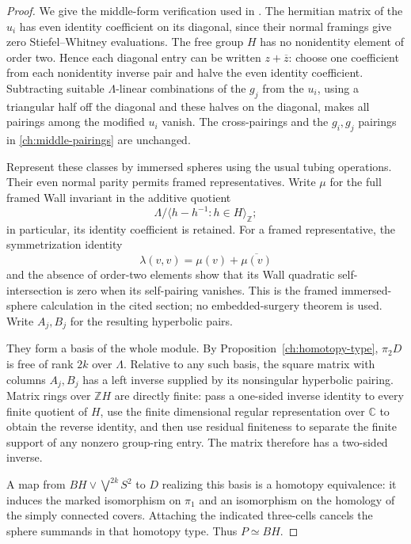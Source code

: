 \begin{proof}
We give the middle-form verification used in
\cite[Section~2.3, ``The middle form and the Poincar\'e pair'']{PD}.
The hermitian matrix of the $u_i$ has even identity coefficient
on its diagonal, since their normal framings give zero
Stiefel--Whitney evaluations.  The free group $H$ has no
nonidentity element of order two.  Hence each diagonal entry
can be written $z+\overline z$: choose one coefficient from
each nonidentity inverse pair and halve the even identity
coefficient.  Subtracting suitable $\Lambda$-linear combinations
of the $g_j$ from the $u_i$, using a triangular half off the
diagonal and these halves on the diagonal, makes all pairings
among the modified $u_i$ vanish.  The cross-pairings and the
$g_i,g_j$ pairings in \eqref{ch:middle-pairings} are unchanged.

Represent these classes by immersed spheres using the usual
tubing operations.  Their even normal parity permits framed
representatives.  Write $\mu$ for the full framed Wall invariant
in the additive quotient
\[
 \Lambda/\langle h-h^{-1}:h\in H\rangle_{\mathbb Z};
\]
in particular, its identity coefficient is retained.  For a framed
representative, the symmetrization identity
\[
 \lambda(v,v)=\mu(v)+\overline{\mu(v)}
\]
and the absence of order-two elements show that its Wall
quadratic self-intersection is zero when its self-pairing
vanishes.  This is the framed immersed-sphere calculation in
the cited section; no embedded-surgery theorem is used.
Write $A_j,B_j$ for the resulting hyperbolic pairs.

They form a basis of the whole module.  By
Proposition~\ref{ch:homotopy-type}, $\pi_2D$ is free of rank
$2k$ over $\Lambda$.  Relative to any such basis, the square
matrix with columns $A_j,B_j$ has a left inverse supplied by
its nonsingular hyperbolic pairing.  Matrix rings over
$\mathbb ZH$ are directly finite: pass a one-sided inverse
identity to every finite quotient of $H$, use the finite
dimensional regular representation over $\mathbb C$ to obtain
the reverse identity, and then use residual finiteness to
separate the finite support of any nonzero group-ring entry.
The matrix therefore has a two-sided inverse.

A map from $BH\vee\bigvee^{2k}S^2$ to $D$ realizing this
basis is a homotopy equivalence: it induces the marked
isomorphism on $\pi_1$ and an isomorphism on the homology of
the simply connected covers.  Attaching the indicated
three-cells cancels the sphere summands in that homotopy
type.  Thus $P\simeq BH$.


\end{proof}
